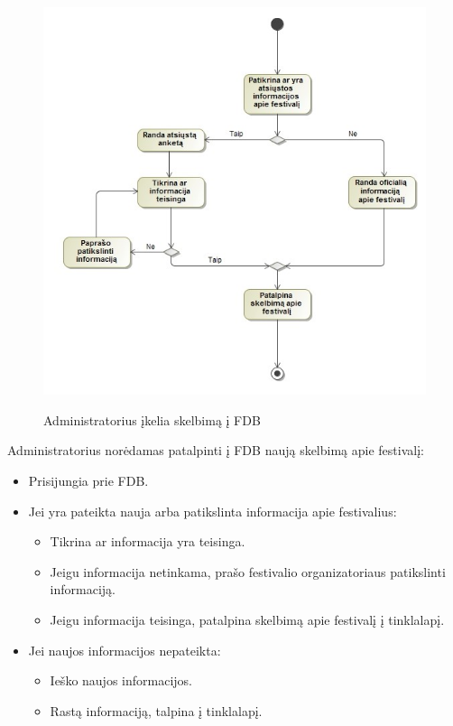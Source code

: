 \documentclass{VUMIFPSkursinis}
\begin{document}
\begin{figure}[H]
    \centering
    \includegraphics[scale=0.7]{img/geri/adminSkelb}
    \label{img:uml16}
	\caption{Administratorius įkelia skelbimą į FDB}
\end{figure}

Administratorius norėdamas patalpinti į FDB naują skelbimą apie festivalį:
\begin{itemize}
\item Prisijungia prie FDB.
\item Jei yra pateikta nauja arba patikslinta informacija apie festivalius:
\begin{itemize}
\item Tikrina ar informacija yra teisinga.
\item Jeigu informacija netinkama, prašo festivalio organizatoriaus patikslinti informaciją.
\item Jeigu informacija teisinga, patalpina skelbimą apie festivalį į tinklalapį.
\end{itemize}
\item Jei naujos informacijos nepateikta:
\begin{itemize}
\item Ieško naujos informacijos.
\item Rastą informaciją, talpina į tinklalapį.
\end{itemize}
\end{itemize}
\end{document}

